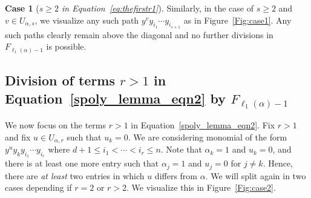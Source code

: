 \documentclass[12pt,reqno]{amsart}
\theoremstyle{plain}
\theoremstyle{definition}
\newtheorem{case}[theorem]{Case}
\begin{document}
\begin{case}[{\it $s \geq 2$ in Equation~\eqref{eq:thefirstr1}}\null] \label{rgeq2}
    Similarly, in the case of $s \geq 2$ and $v \in U_{\alpha, s}$, we visualize any such path $y^{v}y_{i_1} \cdots y_{i_{s+1}}$ as in Figure~\ref{Fig:case1}.
Any such paths clearly remain above the diagonal and no further divisions in $F_{\ell_1(\alpha)-1}$ is possible.
\end{case}	

\subsection{Division of terms $r>1$ in Equation~\eqref{spoly_lemma_eqn2} by $F_{\ell_1(\alpha)-1}$} \label{beta_redu}
We now focus on the terms $r>1$ in Equation~\eqref{spoly_lemma_eqn2}. 
Fix $r>1$ and fix $u \in U_{\alpha, r}$ such that $u_k=0$. We are considering monomial of the form 
$y^{u}y_k y_{i_1} \cdots y_{i_{r}}  $ where $d+1 \leq i_1 < \cdots < i_r \leq n$.
Note that $\alpha_k = 1$ and $u_k =0$, and there is at least one more entry such that $\alpha_j = 1$ and $u_j = 0$ for $j \ne k$. Hence, there are \textit{at least} two entries in which $u$ differs from $\alpha$. We will split again in two cases depending if $r=2$ or $r>2$.
We visualize this in Figure~\ref{Fig:case2}.
\end{document}
